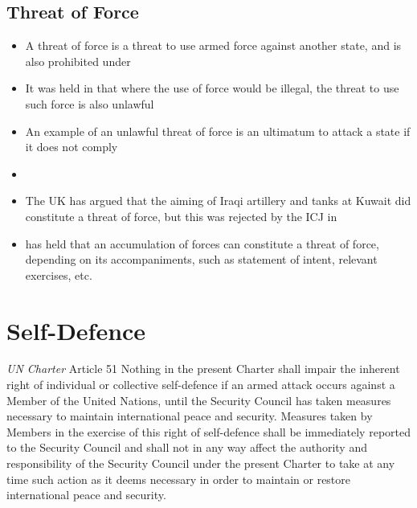 \subsection{Threat of Force}
\begin{itemize}
    \item A threat of force is a threat to use armed force against another state, and is also prohibited under 
    \item It was held in  that where the use of force would be illegal, the threat to use such force is also unlawful
    \item An example of an unlawful threat of force is an ultimatum to attack a state if it does not comply
    \item {}
    \item The UK has argued that the aiming of Iraqi artillery and tanks at Kuwait did constitute a threat of force, but this was rejected by the ICJ in 
    \item {} has held that an accumulation of forces can constitute a threat of force, depending on its accompaniments, such as statement of intent, relevant exercises, etc.
\end{itemize}

\section{Self-Defence}

\begin{conventiondetails}{\textit{UN Charter} Article 51}
    \flushleft
    Nothing in the present Charter shall impair the inherent right of individual or collective self-defence if an armed attack occurs against a Member of the United Nations, until the Security Council has taken measures necessary to maintain international peace and security. Measures taken by Members in the exercise of this right of self-defence shall be immediately reported to the Security Council and shall not in any way affect the authority and responsibility of the Security Council under the present Charter to take at any time such action as it deems necessary in order to maintain or restore international peace and security.
\end{conventiondetails}

